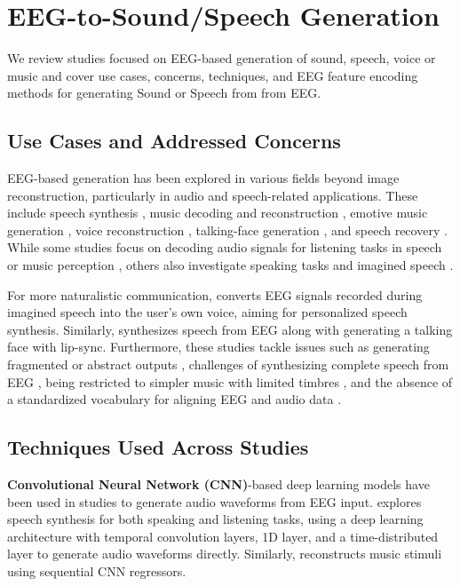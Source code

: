 \section{EEG-to-Sound/Speech Generation}

We review studies focused on EEG-based generation of sound, speech, voice or music and cover use cases, concerns, techniques, and EEG feature encoding methods for generating Sound or Speech from from EEG.

\subsection{Use Cases and Addressed Concerns}   

EEG-based generation has been explored in various fields beyond image reconstruction, particularly in audio and speech-related applications. These include speech synthesis \cite{krishna2021advancing, lee2023speech}, music decoding and reconstruction \cite{ramirez2022eeg2mel, postolache2024naturalistic}, emotive music generation \cite{jiang2024eeg}, voice reconstruction \cite{lee2023towards}, talking-face generation \cite{park2024towards}, and speech recovery \cite{mizuno2024investigation}. While some studies focus on decoding audio signals for listening tasks in speech or music perception \cite{krishna2021advancing, ramirez2022eeg2mel, park2024towards, mizuno2024investigation, postolache2024naturalistic, jiang2024eeg}, others also investigate speaking tasks and imagined speech \cite{krishna2021advancing, lee2023towards, lee2023speech}.

For more naturalistic communication, \citet{lee2023towards} converts EEG signals recorded during imagined speech into the user’s own voice, aiming for personalized speech synthesis. Similarly, \citet{park2024towards} synthesizes speech from EEG along with generating a talking face with lip-sync. Furthermore, these studies tackle issues such as generating fragmented or abstract outputs \cite{park2024towards}, challenges of synthesizing complete speech from EEG \cite{mizuno2024investigation}, being restricted to simpler music with limited timbres \cite{postolache2024naturalistic}, and the absence of a standardized vocabulary for aligning EEG and audio data \cite{jiang2024eeg}.

\subsection{Techniques Used Across Studies}

\textbf{Convolutional Neural Network (CNN)}-based deep learning models have been used in studies \cite{krishna2021advancing, ramirez2022eeg2mel} to generate audio waveforms from EEG input. \citet{krishna2021advancing} explores speech synthesis for both speaking and listening tasks, using a deep learning architecture with temporal convolution layers, 1D layer, and a time-distributed layer to generate audio waveforms directly. Similarly, \citet{ramirez2022eeg2mel} reconstructs music stimuli using sequential CNN regressors.

